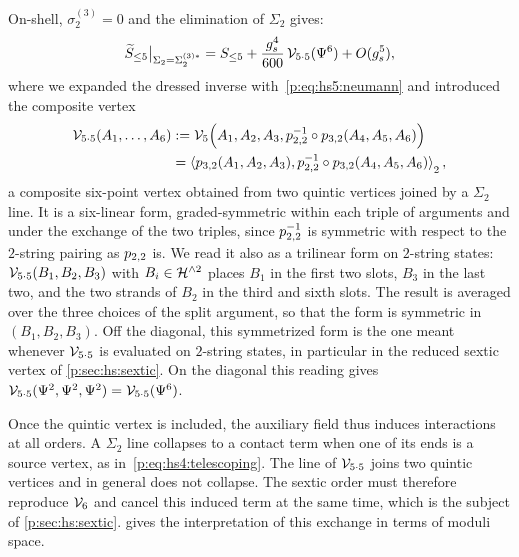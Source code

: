 On-shell, $\sigma_2^{(3)} = 0$ and the elimination of $\Sigma_2$ gives:
\begin{equation}
  \label{p:eq:hs5:eliminate}
  \caction[\le 5] \big|_{\Sigma_2 = \Sigma_2^{(3)*}}
    = S_{\le 5}
      + \frac{\gs^4}{600} \, \vertex{5 \cdot 5}(\Psi^6)
      + O(\gs^5),
\end{equation}
where we expanded the dressed inverse with~\eqref{p:eq:hs5:neumann} and introduced the composite vertex
\begin{equation}
  \label{p:eq:hs5:exchange-vertex}
  \begin{aligned}
    \vertex{5 \cdot 5}(A_1, \ldots, A_6)
      &
      := \vertex{5}\Big( A_1, A_2, A_3, \sprod{2}{2}^{-1} \circ \sprod{3}{2}(A_4, A_5, A_6) \Big)
      \\ &
      = \pair[2]{\sprod{3}{2}(A_1, A_2, A_3)}{\sprod{2}{2}^{-1} \circ \sprod{3}{2}(A_4, A_5, A_6)},
  \end{aligned}
\end{equation}
a composite six-point vertex obtained from two quintic vertices joined by a $\Sigma_2$ line.
It is a six-linear form, graded-symmetric within each triple of arguments and under the exchange of the two triples, since $\sprod{2}{2}^{-1}$ is symmetric with respect to the $2$-string pairing as $\sprod{2}{2}$ is.
We read it also as a trilinear form on $2$-string states: $\vertex{5 \cdot 5}(B_1, B_2, B_3)$ with $B_i \in \Hn{2}$ places $B_1$ in the first two slots, $B_3$ in the last two, and the two strands of $B_2$ in the third and sixth slots.
The result is averaged over the three choices of the split argument, so that the form is symmetric in $(B_1, B_2, B_3)$.
Off the diagonal, this symmetrized form is the one meant whenever $\vertex{5 \cdot 5}$ is evaluated on $2$-string states, in particular in the reduced sextic vertex of \cref{p:sec:hs:sextic}.
On the diagonal this reading gives $\vertex{5 \cdot 5}(\Psi^2, \Psi^2, \Psi^2) = \vertex{5 \cdot 5}(\Psi^6)$.


Once the quintic vertex is included, the auxiliary field thus induces interactions at all orders.
A $\Sigma_2$ line collapses to a contact term when one of its ends is a source vertex, as in~\eqref{p:eq:hs4:telescoping}.
The line of $\vertex{5 \cdot 5}$ joins two quintic vertices and in general does not collapse.
The sextic order must therefore reproduce $\vertex{6}$ and cancel this induced term at the same time, which is the subject of \cref{p:sec:hs:sextic}.
 gives the interpretation of this exchange in terms of moduli space.

